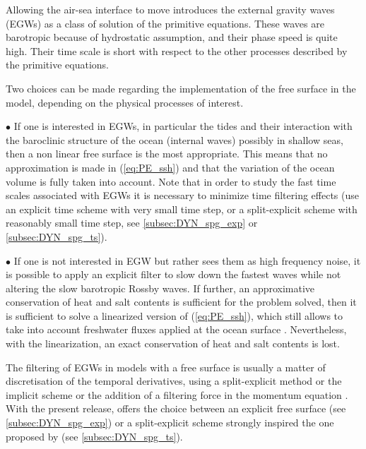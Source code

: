 \documentclass[../main/NEMO_manual]{subfiles}
\begin{document}
Allowing the air-sea interface to move introduces the external gravity waves (EGWs) as
a class of solution of the primitive equations.
These waves are barotropic because of hydrostatic assumption, and their phase speed is quite high.
Their time scale is short with respect to the other processes described by the primitive equations.

Two choices can be made regarding the implementation of the free surface in the model,
depending on the physical processes of interest. 

$\bullet$ If one is interested in EGWs, in particular the tides and their interaction with
the baroclinic structure of the ocean (internal waves) possibly in shallow seas,
then a non linear free surface is the most appropriate.
This means that no approximation is made in (\autoref{eq:PE_ssh}) and that
the variation of the ocean volume is fully taken into account.
Note that in order to study the fast time scales associated with EGWs it is necessary to
minimize time filtering effects
(use an explicit time scheme with very small time step, or a split-explicit scheme with reasonably small time step,
see \autoref{subsec:DYN_spg_exp} or \autoref{subsec:DYN_spg_ts}).

$\bullet$ If one is not interested in EGW but rather sees them as high frequency noise,
it is possible to apply an explicit filter to slow down the fastest waves while
not altering the slow barotropic Rossby waves.
If further, an approximative conservation of heat and salt contents is sufficient for the problem solved,
then it is sufficient to solve a linearized version of (\autoref{eq:PE_ssh}),
which still allows to take into account freshwater fluxes applied at the ocean surface \citep{Roullet_Madec_JGR00}.
Nevertheless, with the linearization, an exact conservation of heat and salt contents is lost.

The filtering of EGWs in models with a free surface is usually a matter of discretisation of
the temporal derivatives,
using a split-explicit method \citep{Killworth_al_JPO91, Zhang_Endoh_JGR92} or
the implicit scheme \citep{Dukowicz1994} or
the addition of a filtering force in the momentum equation \citep{Roullet_Madec_JGR00}.
With the present release, \NEMO offers the choice between
an explicit free surface (see \autoref{subsec:DYN_spg_exp}) or
a split-explicit scheme strongly inspired the one proposed by \citet{Shchepetkin_McWilliams_OM05}
(see \autoref{subsec:DYN_spg_ts}).


\end{document}
